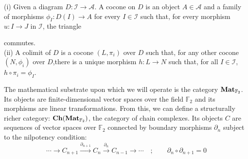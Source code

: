 \documentclass[12pt, twoside, openany]{book}
\newcommand{\catname}[1]{{\normalfont\textbf{#1}}}
\newcommand{\Ch}{\catname{Ch}}
\newcommand{\Mat}{\catname{Mat}}
\begin{document}
\begin{definition} \label{cocone_colimit}
    (i) Given a diagram $D: \mathcal{I} \rightarrow \mathcal{A}$. A cocone on $D$ is an object $A \in \mathcal{A}$ and a family of morphisms $\phi_I: D(I) \rightarrow A$ for every $I \in \mathcal{I}$ such that, for every morphism $u: I \rightarrow J$ in $\mathcal{I}$, the triangle \\
    \begin{center}
    \end{center}
    commutes. \\
    (ii) A colimit of $D$ is a cocone $(L, \pi_i)$ over $D$ such that, for any other cocone $(N, \phi_i)$ over $D$,there is a unique morphism $h: L \rightarrow N$ such that, for all $I \in \mathcal{I}$, $h \circ \pi_i= \phi_I$.
\end{definition}

The mathematical substrate upon which we will operate is the category $\Mat_{\mathbb{F}_2}$. Its objects are finite-dimensional vector spaces over the field $\mathbb{F}_2$ and its morphisms are linear transformations. From this, we can define a structurally richer category: $\Ch(\Mat_{\mathbb{F}_2})$, the category of chain complexes. Its objects $C$ are sequences of vector spaces over $\mathbb{F}_2$
connected by boundary morphisms $\partial_n$ subject to the nilpotency condition:
\begin{equation}
    \cdots \rightarrow C_{n+1} \xrightarrow{\partial_{n+1}} C_n \xrightarrow{\partial_n} C_{n-1} \rightarrow \cdots \quad ; \qquad \partial_n \circ \partial_{n+1} = 0
\end{equation}
\end{document}
